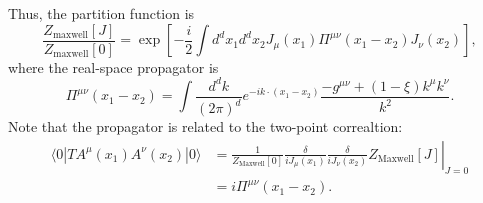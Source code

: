 Thus, the partition function is
\begin{equation}
	\frac{Z_{\mathrm{maxwell}}[J]}{Z_{\mathrm{maxwell}}[0]}
	= \exp\left[-\frac{i}{2}\int d^dx_1 d^dx_2 J_\mu(x_1) \Pi^{\mu\nu}(x_1-x_2) J_\nu(x_2) \right],
\end{equation}
where the real-space propagator is
\begin{equation}
	\Pi^{\mu\nu}(x_1-x_2) = \int \frac{d^d k}{(2\pi)^d} e^{-ik\cdot(x_1-x_2)}\frac{-g^{\mu\nu}+(1-\xi)k^\mu k^\nu}{k^2}.
\end{equation}
Note that the propagator is related to the two-point correaltion:
\begin{equation}
\begin{aligned}
	\langle 0|T A^\mu(x_1) A^\nu(x_2) |0\rangle
	&= \left.\frac{1}{Z_{\mathrm{Maxwell}}[0]}\frac{\delta}{iJ_\mu(x_1)}\frac{\delta}{iJ_\nu(x_2)} Z_{\mathrm{Maxwell}}[J]\right|_{J=0} \\
	&= i\Pi^{\mu\nu}(x_1-x_2).
\end{aligned}
\end{equation}


